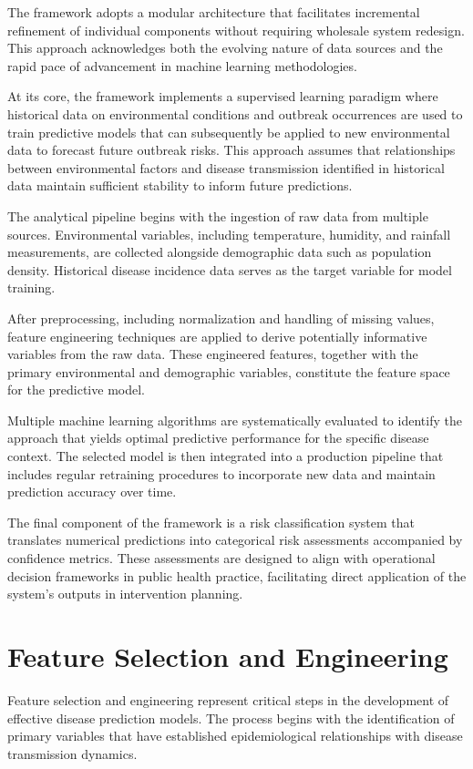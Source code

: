 \documentclass[12pt,a4paper]{report}
\begin{document}
The framework adopts a modular architecture that facilitates incremental refinement of individual components without requiring wholesale system redesign. This approach acknowledges both the evolving nature of data sources and the rapid pace of advancement in machine learning methodologies.

At its core, the framework implements a supervised learning paradigm where historical data on environmental conditions and outbreak occurrences are used to train predictive models that can subsequently be applied to new environmental data to forecast future outbreak risks. This approach assumes that relationships between environmental factors and disease transmission identified in historical data maintain sufficient stability to inform future predictions.

The analytical pipeline begins with the ingestion of raw data from multiple sources. Environmental variables, including temperature, humidity, and rainfall measurements, are collected alongside demographic data such as population density. Historical disease incidence data serves as the target variable for model training.

After preprocessing, including normalization and handling of missing values, feature engineering techniques are applied to derive potentially informative variables from the raw data. These engineered features, together with the primary environmental and demographic variables, constitute the feature space for the predictive model.

Multiple machine learning algorithms are systematically evaluated to identify the approach that yields optimal predictive performance for the specific disease context. The selected model is then integrated into a production pipeline that includes regular retraining procedures to incorporate new data and maintain prediction accuracy over time.

The final component of the framework is a risk classification system that translates numerical predictions into categorical risk assessments accompanied by confidence metrics. These assessments are designed to align with operational decision frameworks in public health practice, facilitating direct application of the system's outputs in intervention planning.

\section{Feature Selection and Engineering}
Feature selection and engineering represent critical steps in the development of effective disease prediction models. The process begins with the identification of primary variables that have established epidemiological relationships with disease transmission dynamics.
\end{document}
